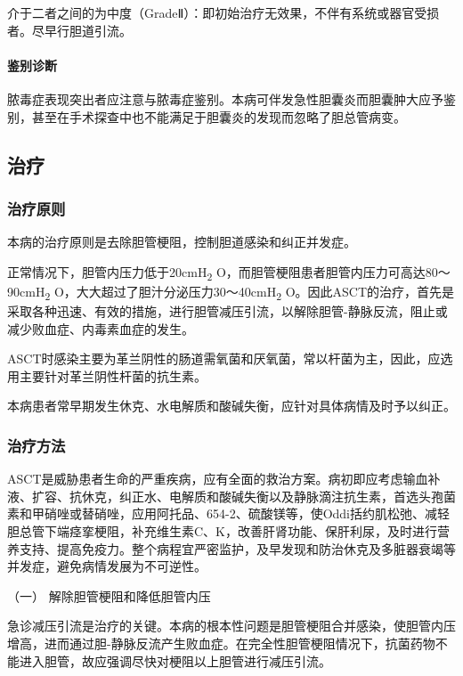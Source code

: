 介于二者之间的为中度（GradeⅡ）：即初始治疗无效果，不伴有系统或器官受损者。尽早行胆道引流。

\paragraph{鉴别诊断}

脓毒症表现突出者应注意与脓毒症鉴别。本病可伴发急性胆囊炎而胆囊肿大应予鉴别，甚至在手术探查中也不能满足于胆囊炎的发现而忽略了胆总管病变。

\subsection{治疗}

\subsubsection{治疗原则}

本病的治疗原则是去除胆管梗阻，控制胆道感染和纠正并发症。

正常情况下，胆管内压力低于20cmH\textsubscript{2}
O，而胆管梗阻患者胆管内压力可高达80～90cmH\textsubscript{2}
O，大大超过了胆汁分泌压力30～40cmH\textsubscript{2}
O。因此ASCT的治疗，首先是采取各种迅速、有效的措施，进行胆管减压引流，以解除胆管-静脉反流，阻止或减少败血症、内毒素血症的发生。

ASCT时感染主要为革兰阴性的肠道需氧菌和厌氧菌，常以杆菌为主，因此，应选用主要针对革兰阴性杆菌的抗生素。

本病患者常早期发生休克、水电解质和酸碱失衡，应针对具体病情及时予以纠正。

\subsubsection{治疗方法}

ASCT是威胁患者生命的严重疾病，应有全面的救治方案。病初即应考虑输血补液、扩容、抗休克，纠正水、电解质和酸碱失衡以及静脉滴注抗生素，首选头孢菌素和甲硝唑或替硝唑，应用阿托品、654-2、硫酸镁等，使Oddi括约肌松弛、减轻胆总管下端痉挛梗阻，补充维生素C、K，改善肝肾功能、保肝利尿，及时进行营养支持、提高免疫力。整个病程宜严密监护，及早发现和防治休克及多脏器衰竭等并发症，避免病情发展为不可逆性。

\hypertarget{text00322.htmlux5cux23CHP11-4-3-2-1}{}
（一） 解除胆管梗阻和降低胆管内压

急诊减压引流是治疗的关键。本病的根本性问题是胆管梗阻合并感染，使胆管内压增高，进而通过胆-静脉反流产生败血症。在完全性胆管梗阻情况下，抗菌药物不能进入胆管，故应强调尽快对梗阻以上胆管进行减压引流。

